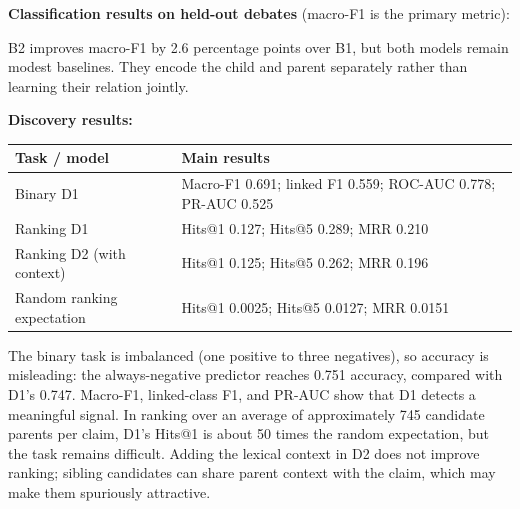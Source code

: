 \documentclass[11pt,a4paper]{article}
\begin{document}
\textbf{Classification results on held-out debates} (macro-F1 is the primary metric):
\begin{center}
\end{center}

B2 improves macro-F1 by 2.6 percentage points over B1, but both models remain modest baselines. They encode the child and parent separately rather than learning their relation jointly.

\textbf{Discovery results:}
\begin{center}
\small
\begin{tabularx}{\linewidth}{lX}
\toprule
Task / model & Main results \\
\midrule
Binary D1 & Macro-F1 0.691; linked F1 0.559; ROC-AUC 0.778; PR-AUC 0.525 \\
Ranking D1 & Hits@1 0.127; Hits@5 0.289; MRR 0.210 \\
Ranking D2 (with context) & Hits@1 0.125; Hits@5 0.262; MRR 0.196 \\
Random ranking expectation & Hits@1 0.0025; Hits@5 0.0127; MRR 0.0151 \\
\bottomrule
\end{tabularx}
\end{center}

The binary task is imbalanced (one positive to three negatives), so accuracy is misleading: the always-negative predictor reaches 0.751 accuracy, compared with D1's 0.747. Macro-F1, linked-class F1, and PR-AUC show that D1 detects a meaningful signal. In ranking over an average of approximately 745 candidate parents per claim, D1's Hits@1 is about 50 times the random expectation, but the task remains difficult. Adding the lexical context in D2 does not improve ranking; sibling candidates can share parent context with the claim, which may make them spuriously attractive.
\end{document}
